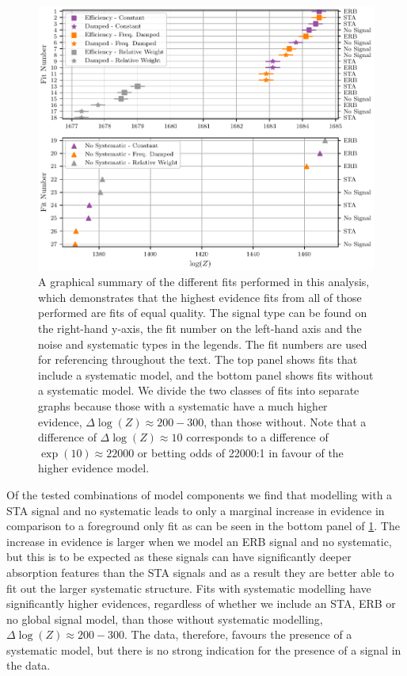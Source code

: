 \begin{figure}
    \centering
    \includegraphics{saras2/figs/extended_table6_plot_fra_only_big_graph.pdf}
    \caption{A graphical summary of the different fits performed in this analysis, which demonstrates that the highest evidence fits from all of those performed are fits of equal quality. The signal type can be found on the right-hand y-axis, the fit number on the left-hand axis and the noise and systematic types in the legends. The fit numbers are used for referencing throughout the text. The top panel shows fits that include a systematic model, and the bottom panel shows fits without a systematic model. We divide the two classes of fits into separate graphs because those with a systematic have a much higher evidence, $\Delta \log(Z) \approx 200-300$, than those without. Note that a difference of $\Delta \log(Z) \approx 10$ corresponds to a difference of $\exp(10)\approx 22000$ or betting odds of 22000:1 in favour of the higher evidence model.}
    \label{fig:model_fits_graph}
\end{figure}

Of the tested combinations of model components we find that modelling with a STA signal and no systematic leads to only a marginal increase in evidence in comparison to a foreground only fit as can be seen in the bottom panel of \cref{fig:model_fits_graph}. The increase in evidence is larger when we model an ERB signal and no systematic, but this is to be expected as these signals can have significantly deeper absorption features than the STA signals and as a result they are better able to fit out the larger systematic structure. Fits with systematic modelling have significantly higher evidences, regardless of whether we include an STA, ERB or no global signal model, than those without systematic modelling, $\Delta \log(Z) \approx 200 - 300$. The data, therefore, favours the presence of a systematic model, but there is no strong indication for the presence of a signal in the data. 

